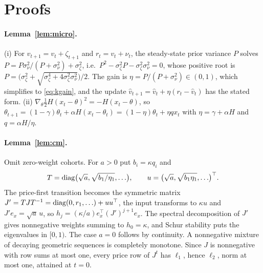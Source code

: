 \documentclass[12pt]{article}
\theoremstyle{definition}
\theoremstyle{remark}
\begin{document}
\appendix
\section{Proofs}\label{app:proofs}

\paragraph{Lemma~\ref{lem:micro}.} (i) For $v_{t+1}=v_t+\zeta_{t+1}$ and $r_t=v_t+\nu_t$, the steady-state prior variance $P$ solves $P=P\sigma_\nu^2/(P+\sigma_\nu^2)+\sigma_\zeta^2$, i.e.\ $P^2-\sigma_\zeta^2P-\sigma_\zeta^2\sigma_\nu^2=0$, whose positive root is $P=\bigl(\sigma_\zeta^2+\sqrt{\sigma_\zeta^4+4\sigma_\zeta^2\sigma_\nu^2}\bigr)/2$. The gain is $\eta=P/(P+\sigma_\nu^2)\in(0,1)$, which simplifies to \eqref{eq:kgain}, and the update $\hat v_{t+1}=\hat v_t+\eta(r_t-\hat v_t)$ has the stated form. (ii) $\nabla_\theta\tfrac12H(x_t-\theta)^2=-H(x_t-\theta)$, so $\theta_{t+1}=(1-\gamma)\theta_t+\alpha H(x_t-\theta_t)=(1-\eta)\theta_t+\eta qx_t$ with $\eta=\gamma+\alpha H$ and $q=\alpha H/\eta$.

\paragraph{Lemma~\ref{lem:cm}.} Omit zero-weight cohorts. For $a>0$ put $b_i=\kappa q_i$ and
\[
T={\rm diag}\bigl(\sqrt a,\sqrt{b_1/\eta_1},\ldots\bigr),\qquad u=\bigl(\sqrt a,\sqrt{b_1\eta_1},\ldots\bigr)^\top .
\]
The price-first transition becomes the symmetric matrix $J'=TJT^{-1}={\rm diag}(0,r_1,\ldots)+uu^\top$, the input transforms to $\kappa u$ and $J'e_x=\sqrt a\,u$, so $h_j=(\kappa/a)e_x^\top(J')^{j+1}e_x$. The spectral decomposition of $J'$ gives nonnegative weights summing to $h_0=\kappa$, and Schur stability puts the eigenvalues in $[0,1)$. The case $a=0$ follows by continuity. A nonnegative mixture of decaying geometric sequences is completely monotone. Since $J$ is nonnegative with row sums at most one, every price row of $J^t$ has $\ell_1$, hence $\ell_2$, norm at most one, attained at $t=0$.
\end{document}
